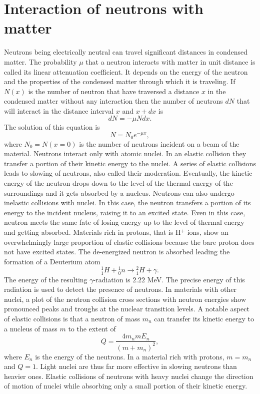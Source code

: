 \documentclass{article}
\numberwithin{equation}{section}
\begin{document}
\section{Interaction of neutrons with matter}\label{s4}
Neutrons being electrically neutral can travel significant distances in
condensed matter. The probability $\mu$ that a neutron interacts with matter
in unit distance is called its linear attenuation coefficient. It depends on
the energy of the neutron and the properties of the condensed matter through
which it is traveling. If $N(x)$ is the number of neutron that have traversed
a distance $x$ in the condensed matter without any interaction then the number
of neutrons $dN$ that will interact in the distance interval $x$ and $x + dx$
is
\begin{equation}\label{s4e1}
dN = -\mu Ndx.
\end{equation}
The solution of this equation is 
\begin{equation}\label{s4e2}
N = N_0 e^{-\mu x},
\end{equation}
where $N_0 = N(x = 0)$ is the number of neutrons incident on a beam of the
material. Neutrons interact only with atomic nuclei. In an elastic collision
they transfer a portion of their kinetic energy to the nuclei. A series of
elastic collisions leads to slowing of neutrons, also called their moderation.
Eventually, the kinetic energy of the neutron drops down to the level of the
thermal energy of the surroundings and it gets absorbed by a nucleus. Neutrons
can also undergo inelastic collisions with nuclei. In this case, the neutron
transfers a portion of its energy to the incident nucleus, raising it to an 
excited state. Even in this case, neutron meets the same fate of losing energy
up to the level of thermal energy and getting absorbed. Materials rich in 
protons, that is H${}^+$ ions, show an overwhelmingly large proportion of
elastic collisions because the bare proton does not have excited states. The
de-energized neutron is absorbed leading the formation of a Deuterium atom
\begin{equation}\label{s4e3}
{}_1^1H + {}^1_0 n \rightarrow {}^2_1 H + \gamma.
\end{equation}
The energy of the resulting $\gamma$-radiation is $2.22$ MeV. The precise 
energy of this radiation is used to detect the presence of neutrons.
In
materials with other nuclei, a plot of the neutron collision cross sections 
with neutron energies show pronounced peaks and troughs at the nuclear 
transition levels. A notable aspect of elastic collisions is that a neutron of
mass $m_n$ can transfer its kinetic energy to a nucleus of mass $m$ to the
extent of
\begin{equation}\label{s4e4}
Q = \frac{4m_nmE_n}{(m + m_n)^2},
\end{equation}
where $E_n$ is the energy of the neutrons. In a material rich with protons,
$m = m_n$ and $Q = 1$. Light nuclei are thus far more effective in slowing
neutrons than heavier ones. Elastic collisions of neutrons with heavy nuclei
change the direction of motion of nuclei while absorbing only a small portion
of their kinetic energy.
\end{document}
